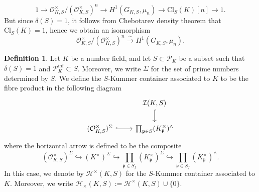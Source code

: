 \documentclass{article}
\theoremstyle{plain}
\theoremstyle{definition}
\newtheorem{defn}[thm]{Definition}
\theoremstyle{remark}
\begin{document}
$$
1 \to \mathcal{O}_{K,S}^{\times}/(\mathcal{O}_{K,S}^{\times})^n \to H^1(G_{K,S},\mu_n) \to \text{Cl}_S(K)[n] \to 1.
$$
But since $\delta(S) = 1$, it follows from Chebotarev density theorem that $\text{Cl}_S(K) = 1$, hence we obtain an isomorphism
$$
\mathcal{O}_{K,S}^{\times}/(\mathcal{O}_{K,S}^{\times})^n \xrightarrow{\sim} H^1(G_{K,S},\mu_n).
$$
\begin{defn}
Let $K$ be a number field, and let $S \subset \mathscr{P}_K$ be a subset such that $\delta(S) = 1$ and $\mathscr{P}_K^{\text{inf}} \subset S$. Moreover, we write $\Sigma$ for the set of prime numbers determined by $S$. We define the $S$-Kummer container associated to $K$ to be the fibre product in the following diagram
$$
\begin{tikzcd}
& \mathcal{I}(K,S) \arrow[d,hookrightarrow] \\
(\mathcal{O}_{K,S}^{\times})^{\Sigma} \arrow[r,hookrightarrow] & \prod_{\mathfrak{p} \in S} (K_{\mathfrak{p}}^{\times})^{\wedge}
\end{tikzcd}
$$
where the horizontal arrow is defined to be the composite
$$
(\mathcal{O}_{K,S}^{\times})^{\Sigma} \hookrightarrow (K^{\times})^{\Sigma} \hookrightarrow \prod_{\mathfrak{p} \in S_f}(K_{\mathfrak{p}}^{\times})^{\Sigma} \hookrightarrow \prod_{\mathfrak{p} \in S_f}(K_{\mathfrak{p}}^{\times})^{\wedge}.
$$
In this case, we denote by $\mathcal{H}^{\times}(K,S)$ for the $S$-Kummer container associated to $K$. Moreover, we write $\mathcal{H}_{\times}(K,S) := \mathcal{H}^{\times}(K,S) \cup \{0\}$.
\end{defn}
\end{document}
